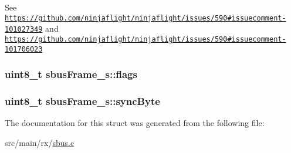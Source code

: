 See \href{https://github.com/ninjaflight/ninjaflight/issues/590#issuecomment-101027349}{\tt https\+://github.\+com/ninjaflight/ninjaflight/issues/590\#issuecomment-\/101027349} and \href{https://github.com/ninjaflight/ninjaflight/issues/590#issuecomment-101706023}{\tt https\+://github.\+com/ninjaflight/ninjaflight/issues/590\#issuecomment-\/101706023} \hypertarget{structsbusFrame__s_a25c718cf2d3caebc9847064355c3c018}{
\subsubsection[{flags}]{\setlength{\rightskip}{0pt plus 5cm}uint8\+\_\+t sbus\+Frame\+\_\+s\+::flags}}\label{structsbusFrame__s_a25c718cf2d3caebc9847064355c3c018}
\hypertarget{structsbusFrame__s_aed468b9a9352df61b0cb3b7f48614980}{
\subsubsection[{sync\+Byte}]{\setlength{\rightskip}{0pt plus 5cm}uint8\+\_\+t sbus\+Frame\+\_\+s\+::sync\+Byte}}\label{structsbusFrame__s_aed468b9a9352df61b0cb3b7f48614980}


The documentation for this struct was generated from the following file\+:\begin{DoxyCompactItemize}
\item 
src/main/rx/\hyperlink{sbus_8c}{sbus.\+c}\end{DoxyCompactItemize}
